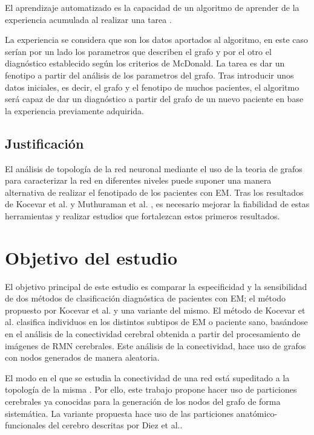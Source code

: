 \documentclass[fleqn,10pt]{UICArticle} %
\begin{document}
El aprendizaje automatizado es la capacidad de un algoritmo de aprender de la experiencia acumulada al realizar una tarea \cite{Friedman1997}.

La experiencia se considera que son los datos aportados al algoritmo, en este caso serían por un lado los parametros que describen el grafo y  por el otro el diagnóstico establecido según los criterios de McDonald. La tarea es dar un fenotipo a partir del análisis de los parametros del grafo. Tras introducir unos datos iniciales, es decir, el grafo y el fenotipo de muchos pacientes, el algoritmo será capaz de dar un diagnóstico a partir del grafo de un nuevo paciente en base la experiencia previamente adquirida.


\subsection{Justificación}

El análisis de topología de la red neuronal mediante el uso de la teoria de grafos para caracterizar la red en diferentes niveles puede suponer una manera alternativa de realizar el fenotipado de los pacientes con EM. Tras los resultados de Kocevar et al.\cite{Kocevar2016} y Muthuraman et al. \cite{Muthuraman2016}, es necesario mejorar la fiabilidad de estas herramientas y realizar estudios que fortalezcan estos primeros resultados.


\section{Objetivo del estudio}

El objetivo principal de este estudio es comparar la especificidad y la sensibilidad de dos métodos de clasificación diagnóstica de pacientes con EM; el método propuesto por Kocevar et al.\cite{Kocevar2016} y una variante del mismo. El método de Kocevar et al.\cite{Kocevar2016} clasifica individuos en los distintos subtipos de EM o paciente sano, basándose en el análisis de la conectividad cerebral obtenida a partir del procesamiento de imágenes de RMN cerebrales. Este análisis de la conectividad, hace uso de grafos con nodos generados de manera aleatoria.

El modo en el que se estudia la conectividad de una red está supeditado a la topología de la misma \cite{Fornito, Zalesky2010}. Por ello, este trabajo propone hacer uso de particiones cerebrales ya conocidas para la generación de los nodos del grafo de forma sistemática. La variante propuesta hace uso de las particiones anatómico-funcionales del cerebro descritas por Diez et al.\cite{Diez2015}.
\end{document}
